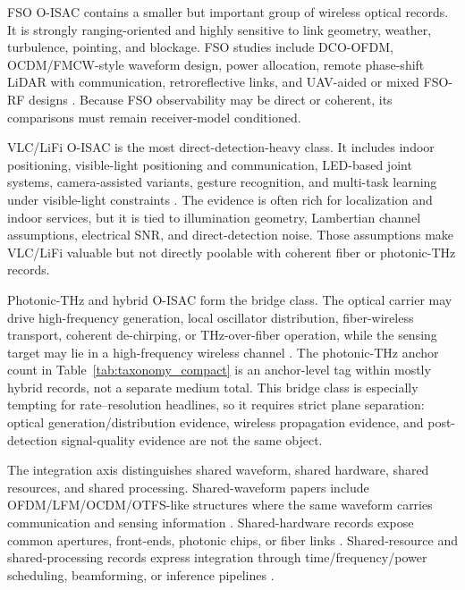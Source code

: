 \documentclass[letterpaper,journal]{IEEEtran}
\begin{document}
FSO O-ISAC contains a smaller but important group of wireless optical records. It is strongly ranging-oriented and highly sensitive to link geometry, weather, turbulence, pointing, and blockage. FSO studies include DCO-OFDM, OCDM/FMCW-style waveform design, power allocation, remote phase-shift LiDAR with communication, retroreflective links, and UAV-aided or mixed FSO-RF designs \cite{O_ISAC_005,O_ISAC_023,O_ISAC_035,O_ISAC_040,O_ISAC_048,O_ISAC_051,O_ISAC_055,O_ISAC_099,O_ISAC_106}. Because FSO observability may be direct or coherent, its comparisons must remain receiver-model conditioned.

VLC/LiFi O-ISAC is the most direct-detection-heavy class. It includes indoor positioning, visible-light positioning and communication, LED-based joint systems, camera-assisted variants, gesture recognition, and multi-task learning under visible-light constraints \cite{O_ISAC_009,O_ISAC_022,O_ISAC_030,O_ISAC_039,O_ISAC_050,O_ISAC_054,O_ISAC_062,O_ISAC_068,O_ISAC_092,O_ISAC_110,O_ISAC_303,O_ISAC_327}. The evidence is often rich for localization and indoor services, but it is tied to illumination geometry, Lambertian channel assumptions, electrical SNR, and direct-detection noise. Those assumptions make VLC/LiFi valuable but not directly poolable with coherent fiber or photonic-THz records.

Photonic-THz and hybrid O-ISAC form the bridge class. The optical carrier may drive high-frequency generation, local oscillator distribution, fiber-wireless transport, coherent de-chirping, or THz-over-fiber operation, while the sensing target may lie in a high-frequency wireless channel \cite{O_ISAC_002,O_ISAC_016,O_ISAC_026,O_ISAC_029,O_ISAC_043,O_ISAC_044,O_ISAC_047,O_ISAC_057,O_ISAC_065,O_ISAC_070,O_ISAC_077,O_ISAC_105}. The photonic-THz anchor count in Table~\ref{tab:taxonomy_compact} is an anchor-level tag within mostly hybrid records, not a separate medium total. This bridge class is especially tempting for rate--resolution headlines, so it requires strict plane separation: optical generation/distribution evidence, wireless propagation evidence, and post-detection signal-quality evidence are not the same object.

The integration axis distinguishes shared waveform, shared hardware, shared resources, and shared processing. Shared-waveform papers include OFDM/LFM/OCDM/OTFS-like structures where the same waveform carries communication and sensing information \cite{O_ISAC_035,O_ISAC_060,O_ISAC_075,O_ISAC_117,O_ISAC_188,O_ISAC_219,O_ISAC_259,O_ISAC_272}. Shared-hardware records expose common apertures, front-ends, photonic chips, or fiber links \cite{O_ISAC_036,O_ISAC_045,O_ISAC_061,O_ISAC_164,O_ISAC_324,O_ISAC_354,O_ISAC_360}. Shared-resource and shared-processing records express integration through time/frequency/power scheduling, beamforming, or inference pipelines \cite{O_ISAC_049,O_ISAC_052,O_ISAC_083,O_ISAC_086,O_ISAC_102,O_ISAC_134,O_ISAC_138,O_ISAC_140,O_ISAC_242,O_ISAC_340}.
\end{document}
